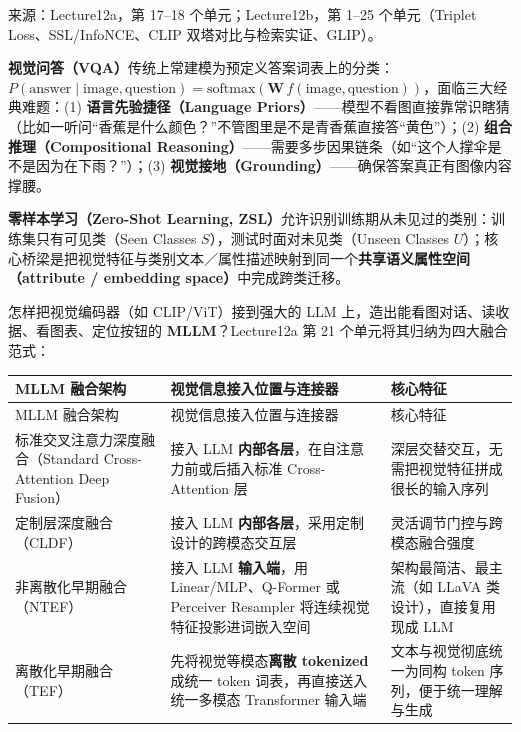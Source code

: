 来源：Lecture12a，第 17–18 个单元；Lecture12b，第 1–25 个单元（Triplet Loss、SSL/InfoNCE、CLIP 双塔对比与检索实证、GLIP）。




\textbf{视觉问答（VQA）}传统上常建模为预定义答案词表上的分类：$P(\text{answer}\mid\text{image},\text{question})=\mathrm{softmax}(\mathbf{W}\,f(\text{image},\text{question}))$，面临三大经典难题：(1) \textbf{语言先验捷径（Language Priors）}——模型不看图直接靠常识瞎猜（比如一听问“香蕉是什么颜色？”不管图里是不是青香蕉直接答“黄色”）；(2) \textbf{组合推理（Compositional Reasoning）}——需要多步因果链条（如“这个人撑伞是不是因为在下雨？”）；(3) \textbf{视觉接地（Grounding）}——确保答案真正有图像内容撑腰。

\textbf{零样本学习（Zero-Shot Learning, ZSL）}允许识别训练期从未见过的类别：训练集只有可见类（Seen Classes $S$），测试时面对未见类（Unseen Classes $U$）；核心桥梁是把视觉特征与类别文本／属性描述映射到同一个\textbf{共享语义属性空间（attribute / embedding space）}中完成跨类迁移。


怎样把视觉编码器（如 CLIP/ViT）接到强大的 LLM 上，造出能看图对话、读收据、看图表、定位按钮的 \textbf{MLLM}？Lecture12a 第 21 个单元将其归纳为四大融合范式：

\begingroup\small\setlength{\tabcolsep}{3pt}\renewcommand{\arraystretch}{1.22}
\begin{longtable}{@{}>{\raggedright\arraybackslash}p{}>{\raggedright\arraybackslash}p{}>{\raggedright\arraybackslash}p{}@{}}
\toprule
MLLM 融合架构 & 视觉信息接入位置与连接器 & 核心特征 \\
\midrule\endfirsthead
MLLM 融合架构 & 视觉信息接入位置与连接器 & 核心特征 \\
\midrule\endhead
\bottomrule\endfoot
标准交叉注意力深度融合（Standard Cross-Attention Deep Fusion） & 接入 LLM \textbf{内部各层}，在自注意力前或后插入标准 Cross-Attention 层 & 深层交替交互，无需把视觉特征拼成很长的输入序列 \\
定制层深度融合（CLDF） & 接入 LLM \textbf{内部各层}，采用定制设计的跨模态交互层 & 灵活调节门控与跨模态融合强度 \\
非离散化早期融合（NTEF） & 接入 LLM \textbf{输入端}，用 Linear/MLP、Q-Former 或 Perceiver Resampler 将连续视觉特征投影进词嵌入空间 & 架构最简洁、最主流（如 LLaVA 类设计），直接复用现成 LLM \\
离散化早期融合（TEF） & 先将视觉等模态\textbf{离散 tokenized} 成统一 token 词表，再直接送入统一多模态 Transformer 输入端 & 文本与视觉彻底统一为同构 token 序列，便于统一理解与生成 \\
\end{longtable}\endgroup

